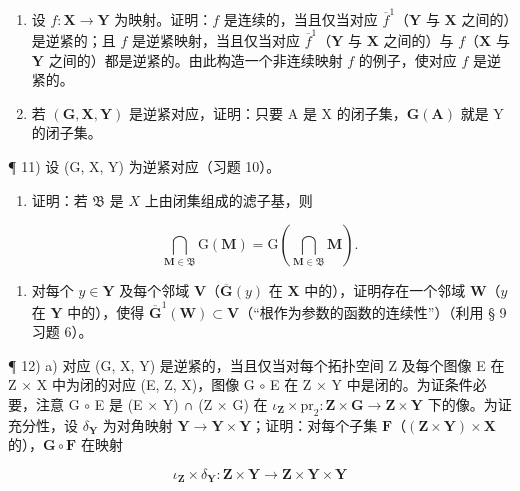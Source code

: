 \begin{enumerate}
\def\labelenumi{\alph{enumi})}
\item
  设 \(f: \mathbf{X} \to \mathbf{Y}\) 为映射。证明：\(f\) 是连续的，当且仅当对应 \(\overline{f}^1\)（\(\mathbf{Y}\) 与 \(\mathbf{X}\) 之间的）是逆紧的；且 \(f\) 是逆紧映射，当且仅当对应 \(\overline{f}^1\)（\(\mathbf{Y}\) 与 \(\mathbf{X}\) 之间的）与 \(f\)（\(\mathbf{X}\) 与 \(\mathbf{Y}\) 之间的）都是逆紧的。由此构造一个非连续映射 \(f\) 的例子，使对应 \(f\) 是逆紧的。
\item
  若 \((\mathbf{G}, \mathbf{X}, \mathbf{Y})\) 是逆紧对应，证明：只要 A 是 X 的闭子集，\(\mathbf{G}(\mathbf{A})\) 就是 Y 的闭子集。
\end{enumerate}

¶ 11) 设 (G, X, Y) 为逆紧对应（习题 10）。

\begin{enumerate}
\def\labelenumi{\alph{enumi})}
\tightlist
\item
  证明：若 \(\mathfrak{B}\) 是 \(X\) 上由闭集组成的滤子基，则
\end{enumerate}

\[
\bigcap_ {\mathbf {M} \in \mathfrak {B}} \mathrm{G} (\mathbf {M}) = \mathrm{G} \left(\bigcap_ {\mathbf {M} \in \mathfrak {B}} \mathbf {M}\right).
\]

\begin{enumerate}
\def\labelenumi{\alph{enumi})}
\setcounter{enumi}{1}
\tightlist
\item
  对每个 \(y \in \mathbf{Y}\) 及每个邻域 \(\mathbf{V}\)（\(\overline{\mathbf{G}}(y)\) 在 \(\mathbf{X}\) 中的），证明存在一个邻域 \(\mathbf{W}\)（\(y\) 在 \(\mathbf{Y}\) 中的），使得 \(\overline{\mathbf{G}}^{1}(\mathbf{W}) \subset \mathbf{V}\)（“根作为参数的函数的连续性”）（利用 § 9 习题 6）。
\end{enumerate}

¶ 12) a) 对应 (G, X, Y) 是逆紧的，当且仅当对每个拓扑空间 Z 及每个图像 E 在 Z × X 中为闭的对应 (E, Z, X)，图像 G \(\circ\) E 在 Z × Y 中是闭的。为证条件必要，注意 G \(\circ\) E 是 (E × Y) ∩ (Z × G) 在 \(\iota_{\mathbf{Z}} \times \mathrm{pr}_{2} : \mathbf{Z} \times \mathbf{G} \to \mathbf{Z} \times \mathbf{Y}\) 下的像。为证充分性，设 \(\delta_{\mathbf{Y}}\) 为对角映射 \(\mathbf{Y} \to \mathbf{Y} \times \mathbf{Y}\)；证明：对每个子集 \(\mathbf{F}\)（\((\mathbf{Z} \times \mathbf{Y}) \times \mathbf{X}\) 的），\(\mathbf{G} \circ \mathbf{F}\) 在映射

\[
\iota_ {\mathbf {Z}} \times \delta_ {\mathbf {Y}}: \mathbf {Z} \times \mathbf {Y} \rightarrow \mathbf {Z} \times \mathbf {Y} \times \mathbf {Y}
\]

